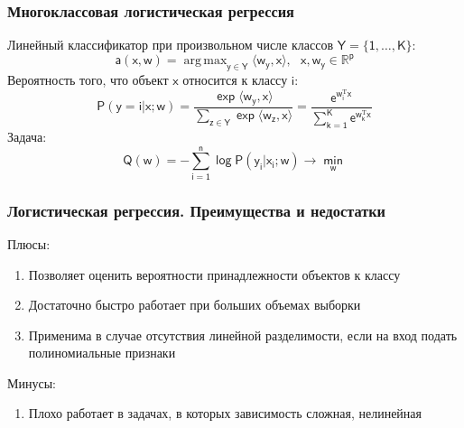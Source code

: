 \documentclass[unicode, notheorems]{beamer}
\DeclareMathOperator*{\argmax}{arg\,max}
\begin{document}
\begin{frame}
	\frametitle{Многоклассовая логистическая регрессия}
	Линейный классификатор при произвольном числе классов $\mathsf{Y=\{1,\ldots,K\}}$: 
	\begin{equation*}
	\mathsf{a(x,w)=\argmax_{y\in Y}\langle w_y,x \rangle,~~~x,w_y\in\mathbb{R}^p }
	\end{equation*}
	Вероятность того, что объект $\mathsf{x}$ относится к классу $\mathsf{i}$:
	\begin{equation*}
	\mathsf{P(y=i|x;w)=\frac{\exp{\langle w_y,x \rangle}}{\sum\limits_{z\in Y}\exp{\langle w_z,x \rangle}}=\frac{e^{w_i^{\mathrm{T}}x}}{\sum\limits_{k=1}^Ke^{w_k^{\mathrm{T}}x}} }
	\end{equation*}
	Задача:
		\begin{equation*}
	\mathsf{Q(w)=-\sum\limits_{i=1}^n\log P(y_i|x_i;w)\to \min\limits_w }
	\end{equation*}
\end{frame}

\begin{frame}
\frametitle{Логистическая регрессия. Преимущества и недостатки}
Плюсы:
\begin{enumerate}
	\item Позволяет оценить вероятности принадлежности объектов к классу
	\item Достаточно быстро работает при больших объемах выборки
	\item Применима в случае отсутствия линейной разделимости, если на вход подать полиномиальные признаки
\end{enumerate}

Минусы:
\begin{enumerate}
	\item Плохо работает в задачах, в которых зависимость сложная, нелинейная
\end{enumerate}
\end{frame}
\end{document}
